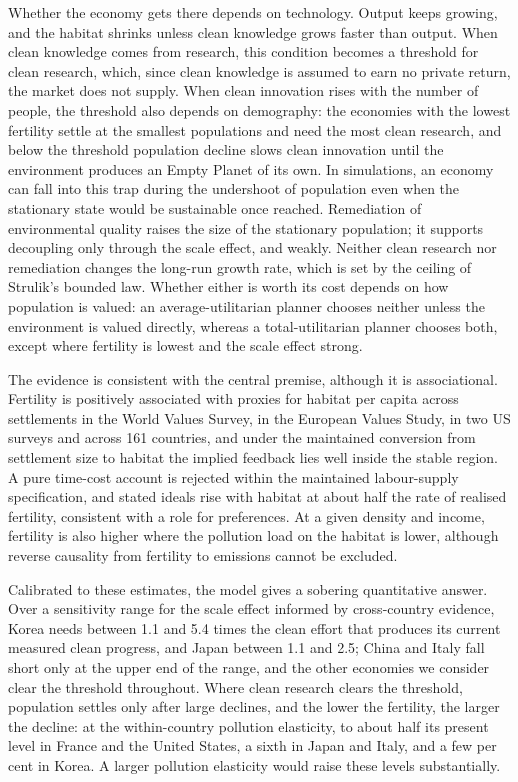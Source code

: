 \documentclass[11pt]{article}
\begin{document}
Whether the economy gets there depends on technology. Output keeps growing, and the habitat shrinks
unless clean knowledge grows faster than output. When clean knowledge comes from research, this
condition becomes a threshold for clean research, which, since clean knowledge is assumed to earn no
private return, the market does not supply. When clean innovation rises with the number of people, the
threshold also depends on demography: the economies with the lowest fertility settle at the smallest
populations and need the most clean research, and below the threshold population decline slows clean
innovation until the environment produces an Empty Planet of its own. In simulations, an economy can
fall into this trap during the undershoot of population even when the stationary state would be
sustainable once reached. Remediation of environmental quality raises the size of the stationary
population; it supports decoupling only through the scale effect, and weakly. Neither clean research
nor remediation changes the long-run growth rate, which is set by the ceiling of Strulik's bounded law.
Whether either is worth its cost depends on how population is valued: an average-utilitarian planner
chooses neither unless the environment is valued directly, whereas a total-utilitarian planner chooses
both, except where fertility is lowest and the scale effect strong.

The evidence is consistent with the central premise, although it is associational. Fertility is
positively associated with proxies for habitat per capita across settlements in the World Values Survey,
in the European Values Study, in two US surveys and across 161 countries, and under the maintained
conversion from settlement size to habitat the implied feedback lies well inside the stable region. A
pure time-cost account is rejected within the maintained labour-supply specification, and stated ideals
rise with habitat at about half the rate of realised fertility, consistent with a role for preferences.
At a given density and income, fertility is also higher where the pollution load on the habitat is
lower, although reverse causality from fertility to emissions cannot be excluded.

Calibrated to these estimates, the model gives a sobering quantitative answer. Over a sensitivity range
for the scale effect informed by cross-country evidence, Korea needs between 1.1 and 5.4 times the
clean effort that produces its current measured clean progress, and Japan between 1.1 and 2.5; China and
Italy fall short only at the upper end of the range, and the other economies we consider clear the
threshold throughout. Where clean research clears the threshold, population settles only after large
declines, and the lower the fertility, the larger the decline: at the within-country pollution
elasticity, to about half its present level in France and the United States, a sixth in Japan and
Italy, and a few per cent in Korea. A larger pollution elasticity would raise these levels substantially.
\end{document}
